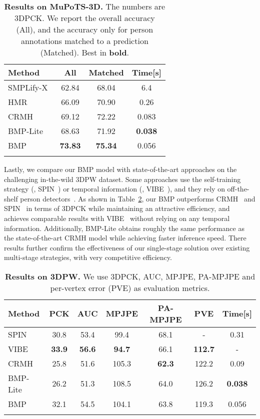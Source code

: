\documentclass[final]{cvpr}
\begin{document}
\begin{table}[!h]
\footnotesize
    \setlength\tabcolsep{4mm}
    \centering
	\begin{tabular}{l|c|c|c}
	\Xhline{1pt}
	Method & All & Matched & Time[s]\\
	\hline
	SMPLify-X~\cite{pavlakos2019expressive} & 62.84 & 68.04 & 6.4 \\
	HMR~\cite{hmrKanazawa17} & 66.09 & 70.90 & 0.26 \\	
	CRMH~\cite{jiang2020coherent} & {69.12} & {72.22} & 0.083 \\
	BMP-Lite & 68.63 & 71.92 & \textbf{0.038} \\
	BMP & \textbf{73.83} & \textbf{75.34} & 0.056 \\
	\Xhline{1pt}
	\end{tabular}
	\caption{\textbf{Results on MuPoTS-3D.} The numbers are 3DPCK. We report the overall accuracy (All), and the accuracy only for person annotations matched to a prediction (Matched). Best in \textbf{bold}.}
	\label{tab:mupots}
\end{table}

Lastly, we compare our BMP model with state-of-the-art approaches on the challenging in-the-wild 3DPW dataset.
Some approaches use the self-training strategy (\ie, SPIN~\cite{kolotouros2019spin}) or  temporal information (\ie, VIBE~\cite{kocabas2020vibe}), and they rely on off-the-shelf person detectors~\cite{cao2018openpose,redmon2018yolov3}. 
As shown in Table~\ref{tab:3dpw}, our BMP outperforms CRMH~\cite{jiang2020coherent} and SPIN~\cite{kolotouros2019spin} in terms of 3DPCK while maintaining an attractive efficiency, and achieves comparable results with VIBE~\cite{kocabas2020vibe} without relying on any temporal information.
Additionally, BMP-Lite obtains roughly the same performance as the state-of-the-art CRMH model while achieving  faster inference speed. 
There results further confirm the effectiveness of our single-stage solution over existing multi-stage strategies, with very competitive efficiency.

\begin{table}[!h]
\setlength\tabcolsep{4.5pt}
\centering
\footnotesize
    \begin{tabular}{l|cccccc}
    \Xhline{1pt}
    Method 
    &  
    PCK&
    AUC&
    MPJPE& 
    PA-MPJPE& 
    PVE&
    Time[s]
    \\
    \hline
        SPIN~\cite{kolotouros2019spin} & 30.8 & 53.4 & 99.4 & 68.1 & -  & 0.31 \\
        VIBE~\cite{kocabas2020vibe} & \textbf{33.9} & \textbf{56.6} & \textbf{94.7} & 66.1 & \textbf{112.7} &  - \\
        CRMH~\cite{jiang2020coherent} & 25.8 & 51.6  & 105.3 & \textbf{62.3}  & 122.2 &  0.09 \\
     	BMP-Lite & 26.2 & 51.3 & 108.5 & 64.0 & 126.2 &  \textbf{0.038} \\
        BMP & 32.1 & 54.5 & 104.1 & 63.8 & 119.3 &  0.056 \\
    \Xhline{1pt}
    \end{tabular}
    \caption{\textbf{Results on 3DPW.} We use 3DPCK, AUC, MPJPE, PA-MPJPE and per-vertex error (PVE) as evaluation metrics.  }  \label{tab:3dpw}\end{table}
\end{document}
